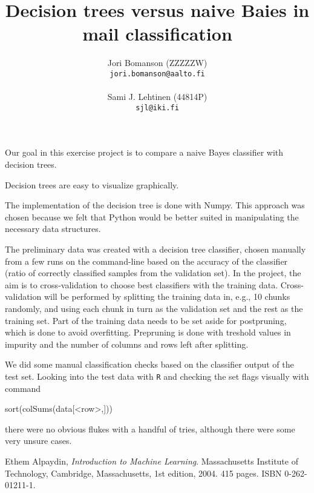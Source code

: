 \documentclass[a4paper,10pt]{article}
\title{Decision trees versus naive Baies in mail classification}
\author{Jori Bomanson (ZZZZZW) \\
  {\tt jori.bomanson@aalto.fi} \\
  \\
  Sami J. Lehtinen (44814P)\\ 
  {\tt sjl@iki.fi} \\
}
\begin{document}

\maketitle

Our goal in this exercise project is to compare a naive Bayes classifier
with decision trees.  

Decision trees are easy to visualize graphically.

The implementation of the decision tree is done with Numpy.  This
approach was chosen because we felt that Python would be better suited
in manipulating the necessary data structures.

The preliminary data was created with a decision tree classifier, chosen
manually from a few runs on the command-line based on the accuracy of
the classifier (ratio of correctly classified samples from the
validation set).  In the project, the aim is to cross-validation to
choose best classifiers with the training data.  Cross-validation will
be performed by splitting the training data in, e.g., 10 chunks
randomly, and using each chunk in turn as the validation set and the
rest as the training set.  Part of the training data needs to be set
aside for postpruning, which is done to avoid overfitting.  Prepruning
is done with treshold values in impurity and the number of columns and
rows left after splitting.  

We did some manual classification checks based on the classifier output
of the test set.  Looking into the test data with \texttt{R} and
checking the set flags visually with command

\begin{log}
sort(colSums(data[<row>,]))
\end{log}

there were no obvious flukes with a handful of tries, although there
were some very unsure cases.

\begin{thebibliography}{9}
  Ethem Alpaydin,
  \emph{Introduction to Machine Learning}.
  Massachusetts Institute of Technology, Cambridge, Massachusetts,
  1st edition,
  2004. 415 pages. ISBN 0-262-01211-1.
\end{thebibliography}
\end{document}
